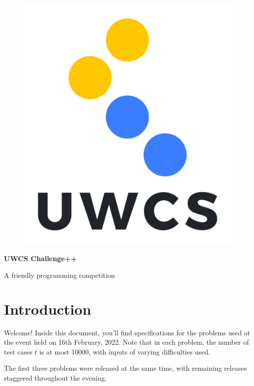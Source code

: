 \documentclass[a4paper,11pt,parskip=half-]{scrartcl}
\begin{document}
\begin{figure}
    \vspace{-10pt} %
    \includegraphics[width=0.8\linewidth]{shield.png} %
    \vspace{-100pt} %
\end{figure}

\normalfont \Huge \bfseries UWCS Challenge++

\normalfont\Large A friendly programming competition
\normalsize

\section*{Introduction}

Welcome! 
Inside this document, you'll find specifications for the problems used at the event held on 16th February, 2022. 
Note that in each problem, the number of test cases $t$ is at most 10000, with inputs of varying difficulties used.

The first three problems were released at the same time, with remaining releases staggered throughout the evening.

% 

\tableofcontents

\newpage



\newpage

\newpage

\newpage

\newpage

\end{document}
